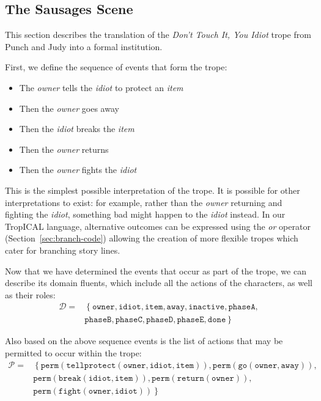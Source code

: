 \documentclass[11pt]{report}
\begin{document}
\subsection{The Sausages Scene}
\label{sec:dont-touch-inst}

This section describes the translation of the \emph{Don't Touch It, You Idiot}
trope from Punch and Judy into a formal institution.

First, we define the sequence of events that form the trope:

\begin{itemize}
\item The \emph{owner} tells the \emph{idiot} to protect an \emph{item}
\item Then the \emph{owner} goes away
\item Then the \emph{idiot} breaks the \emph{item}
\item Then the \emph{owner} returns
\item Then the \emph{owner} fights the \emph{idiot}
\end{itemize}

This is the simplest possible interpretation of the trope. It is possible for
other interpretations to exist: for example, rather than the \emph{owner} returning and
fighting the \emph{idiot}, something bad might happen to the \emph{idiot}
instead. In our TropICAL language, alternative outcomes can be expressed using
the \emph{or} operator (Section~\ref{sec:branch-code}) allowing the creation of more flexible tropes
which cater for branching story lines.

Now that we have determined the events that occur as part of the trope, we can describe its domain fluents, which include all the
actions of the characters, as well as their roles:
\begin{align*}
  \mathcal{D} =&\left\{\mathtt{owner, idiot, item, away, inactive, phaseA,}\right.\\\nonumber
  &\left. {} \mathtt{phaseB, phaseC, phaseD, phaseE, done}\right\} %
\end{align*}

Also based on the above sequence events is the list of actions that may be
permitted to occur within the trope:
\begin{align*}
  \mathcal{P} =& \left\{\mathtt{perm(tellprotect(owner, idiot, item)), perm(go(owner, away)),}\right.\nonumber\\
  &\left. {} \mathtt{perm(break(idiot, item)), perm(return(owner)),}\right.\nonumber\\
             &\left. {} \mathtt{perm(fight(owner, idiot))}\right\} %
\end{align*}
\end{document}
